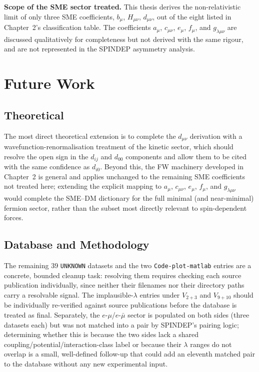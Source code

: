 \documentclass[main]{subfiles}
\begin{document}
\textbf{Scope of the SME sector treated.} This thesis derives the
non-relativistic limit of only three SME coefficients,
$b_\mu$, $H_{\mu\nu}$, $d_{\mu\nu}$, out of the eight listed in
Chapter~2's classification table. The coefficients $a_\mu$, $c_{\mu\nu}$,
$e_\mu$, $f_\mu$, and $g_{\lambda\mu\nu}$ are discussed qualitatively for
completeness but not derived with the same rigour, and are not represented
in the SPINDEP asymmetry analysis.

\section{Future Work}

\subsection{Theoretical}

The most direct theoretical extension is to complete the $d_{\mu\nu}$
derivation with a wavefunction-renormalisation treatment of the kinetic
sector, which should resolve the open sign in the $d_{ij}$ and $d_{00}$
components and allow them to be cited with the same confidence as
$d_{i0}$. Beyond this, the FW machinery developed in Chapter~2 is general
and applies unchanged to the remaining SME coefficients not treated here;
extending the explicit mapping to $a_\mu$, $c_{\mu\nu}$, $e_\mu$, $f_\mu$,
and $g_{\lambda\mu\nu}$ would complete the SME--DM dictionary for the full
minimal (and near-minimal) fermion sector, rather than the subset most
directly relevant to spin-dependent forces.

\subsection{Database and Methodology}

The remaining 39 \texttt{UNKNOWN} datasets and the two
\texttt{Code-plot-matlab} entries are a concrete, bounded cleanup task:
resolving them requires checking each source publication individually,
since neither their filenames nor their directory paths carry a
resolvable signal. The implausible-$\lambda$ entries under $V_{2+3}$ and
$V_{9+10}$ should be
individually re-verified against source publications before the database
is treated as final. Separately, the $e$-$\mu$/$e$-$\bar\mu$ sector is
populated on both sides (three datasets each) but was not matched into a
pair by SPINDEP's pairing logic; determining whether this is because the
two sides lack a shared coupling/potential/interaction-class label or
because their $\lambda$ ranges do not overlap is a small, well-defined
follow-up that could add an eleventh matched pair to the database without
any new experimental input.
\end{document}

